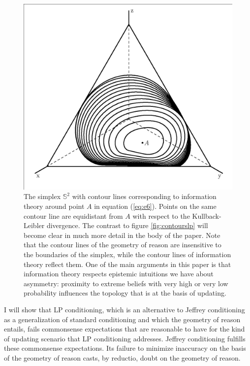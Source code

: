 \documentclass[11pt]{article}
\begin{document}
\begin{figure}[ht]
  \begin{flushright}
    \begin{minipage}[h]{.7\linewidth}
      \includegraphics[width=\textwidth]{crj.eps}
      \caption{\footnotesize The simplex $\mathbb{S}^{2}$ with contour
        lines corresponding to information theory around point $A$ in
        equation (\ref{eq:e6}). Points on the same contour line are
        equidistant from $A$ with respect to the Kullback-Leibler
        divergence. The contrast to figure \ref{fig:contourslp} will
        become clear in much more detail in the body of the paper.
        Note that the contour lines of the geometry of reason are
        insensitive to the boundaries of the simplex, while the
        contour lines of information theory reflect them. One of the
        main arguments in this paper is that information theory
        respects epistemic intuitions we have about asymmetry:
        proximity to extreme beliefs with very high or very low
        probability influences the topology that is at the basis of
        updating.}
      \label{fig:contoursrj}
    \end{minipage}
  \end{flushright}
\end{figure}

I will show that LP conditioning, which is an alternative to Jeffrey
conditioning as a generalization of standard conditioning and which
the geometry of reason entails, fails commonsense expectations that
are reasonable to have for the kind of updating scenario that LP
conditioning addresses. Jeffrey conditioning fulfills these
commonsense expectations. Its failure to minimize inaccuracy on the
basis of the geometry of reason casts, by reductio, doubt on the
geometry of reason.
\end{document}
